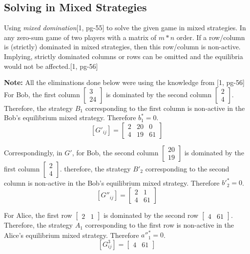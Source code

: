 \documentclass{article}
\begin{document}
\subsection{Solving in Mixed Strategies}
 
Using \textit{mixed domination}[1, pg-55] to solve the given game in mixed strategies. In any zero-sum game of two players with a matrix of $m * n$ order. If a row/column is (strictly) dominated in mixed strategies, then this row/column is non-active. Implying, strictly dominated columns or rows can be omitted and the equilibria would not be affected.[1, pg-56]

\textbf{Note:} All the eliminations done below were using the knowledge from [1, pg-56] \\


For Bob, the first column $\begin{bmatrix} 3 \\ 24 \end{bmatrix}$ is dominated by the second column $\begin{bmatrix} 2 \\ 4 \end{bmatrix}$. Therefore, the strategy $B_1$ corresponding to the first column is non-active in 
the Bob's equilibrium mixed strategy. Therefore $b^*_1=0$.\\
$$
[G'_{ij}] = 
\begin{bmatrix}
2 & 20 & 0\\
4 & 19 & 61
\end{bmatrix}
$$

Correspondingly, in $G'$, for Bob, the second column $\begin{bmatrix} 20 \\ 19 \end{bmatrix}$ is dominated by the first column $\begin{bmatrix} 2 \\ 4 \end{bmatrix}$. therefore, the strategy $B'_2$ corresponding to the second column is non-active in the Bob's equilibrium mixed strategy. Therefore $b'^*_2=0$.\\
$$
[G''_{ij}] = 
\begin{bmatrix}
2 & 1\\
4 & 61
\end{bmatrix}
$$

For Alice, the first row $\begin{bmatrix} 2 & 1 \end{bmatrix}$ is dominated by the second row $\begin{bmatrix} 4 & 61 \end{bmatrix}$. Therefore, the strategy $A_1$ corresponding to the first row is non-active in the Alice's equilibrium mixed strategy. Therefore $a''^*_1=0$.\\
$$
[G^3_{ij}] = 
\begin{bmatrix}
4 & 61
\end{bmatrix}
$$
\end{document}
